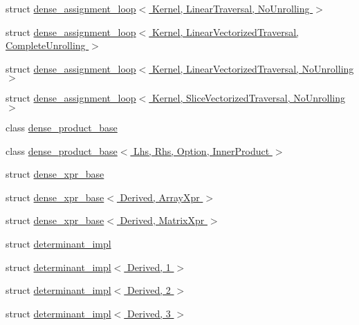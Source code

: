 \begin{DoxyCompactItemize}
\item 
struct \hyperlink{struct_eigen_1_1internal_1_1dense__assignment__loop_3_01_kernel_00_01_linear_traversal_00_01_no_unrolling_01_4}{dense\+\_\+assignment\+\_\+loop$<$ Kernel, Linear\+Traversal, No\+Unrolling $>$}
\item 
struct \hyperlink{struct_eigen_1_1internal_1_1dense__assignment__loop_3_01_kernel_00_01_linear_vectorized_traversal_00_01_complete_unrolling_01_4}{dense\+\_\+assignment\+\_\+loop$<$ Kernel, Linear\+Vectorized\+Traversal, Complete\+Unrolling $>$}
\item 
struct \hyperlink{struct_eigen_1_1internal_1_1dense__assignment__loop_3_01_kernel_00_01_linear_vectorized_traversal_00_01_no_unrolling_01_4}{dense\+\_\+assignment\+\_\+loop$<$ Kernel, Linear\+Vectorized\+Traversal, No\+Unrolling $>$}
\item 
struct \hyperlink{struct_eigen_1_1internal_1_1dense__assignment__loop_3_01_kernel_00_01_slice_vectorized_traversal_00_01_no_unrolling_01_4}{dense\+\_\+assignment\+\_\+loop$<$ Kernel, Slice\+Vectorized\+Traversal, No\+Unrolling $>$}
\item 
class \hyperlink{class_eigen_1_1internal_1_1dense__product__base}{dense\+\_\+product\+\_\+base}
\item 
class \hyperlink{class_eigen_1_1internal_1_1dense__product__base_3_01_lhs_00_01_rhs_00_01_option_00_01_inner_product_01_4}{dense\+\_\+product\+\_\+base$<$ Lhs, Rhs, Option, Inner\+Product $>$}
\item 
struct \hyperlink{struct_eigen_1_1internal_1_1dense__xpr__base}{dense\+\_\+xpr\+\_\+base}
\item 
struct \hyperlink{struct_eigen_1_1internal_1_1dense__xpr__base_3_01_derived_00_01_array_xpr_01_4}{dense\+\_\+xpr\+\_\+base$<$ Derived, Array\+Xpr $>$}
\item 
struct \hyperlink{struct_eigen_1_1internal_1_1dense__xpr__base_3_01_derived_00_01_matrix_xpr_01_4}{dense\+\_\+xpr\+\_\+base$<$ Derived, Matrix\+Xpr $>$}
\item 
struct \hyperlink{struct_eigen_1_1internal_1_1determinant__impl}{determinant\+\_\+impl}
\item 
struct \hyperlink{struct_eigen_1_1internal_1_1determinant__impl_3_01_derived_00_011_01_4}{determinant\+\_\+impl$<$ Derived, 1 $>$}
\item 
struct \hyperlink{struct_eigen_1_1internal_1_1determinant__impl_3_01_derived_00_012_01_4}{determinant\+\_\+impl$<$ Derived, 2 $>$}
\item 
struct \hyperlink{struct_eigen_1_1internal_1_1determinant__impl_3_01_derived_00_013_01_4}{determinant\+\_\+impl$<$ Derived, 3 $>$}

\end{DoxyCompactItemize}
